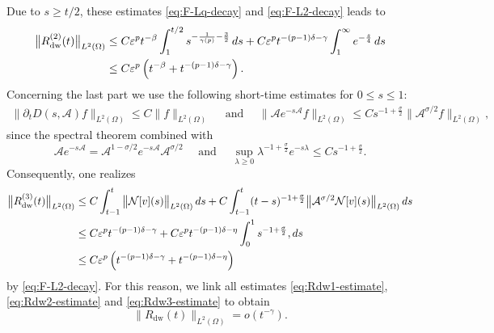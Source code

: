 \documentclass[a4paper,11pt]{article} %
\theoremstyle{remark}
\theoremstyle{definition}
\numberwithin{equation}{section}
\begin{document}
Due to \(s\ge t/2\), these estimates
\eqref{eq:F-Lq-decay} and \eqref{eq:F-L2-decay} leads to
\begin{align}
\big\|R_{\mathrm{dw}}^{(2)}(t)\big\|_{L^2(\Omega)}
&\le
C\varepsilon^p t^{-\beta}
\int_1^{t/2}s^{-\frac{1}{\gamma(p)}-\frac{3}{2}}\,ds
+
C\varepsilon^p t^{-(p-1)\delta-\gamma}
\int_1^\infty e^{-\frac{s}{4}}\,ds \notag\\
&\le
C\varepsilon^p
\left(
t^{-\beta}+t^{-(p-1)\delta-\gamma}
\right). \label{eq:Rdw2-estimate}
\end{align}
Concerning the last part we use the following short-time estimates for $0\le s\le1$:
\begin{align*}
    \big\|\partial_tD(s,\mathcal{A})f\big\|_{L^2(\Omega)} \le C\|f\|_{L^2(\Omega)} \quad \text{ and }\quad 
    \big\|\mathcal{A}e^{-s \mathcal{A}}f\big\|_{L^2(\Omega)} \le Cs^{-1+\frac{\sigma}{2}}\big\|\mathcal{A}^{\sigma/2}f\big\|_{L^2(\Omega)},
\end{align*}
since the spectral theorem combined with
$$
\mathcal{A}e^{-s \mathcal{A}}
=
\mathcal{A}^{1-\sigma/2}e^{-s \mathcal{A}}\mathcal{A}^{\sigma/2}
\quad \text{ and }\quad
\sup_{\lambda\ge0}
\lambda^{-1+\frac{\sigma}{2}}e^{-s\lambda}
\le
Cs^{-1+\frac{\sigma}{2}}.
$$
Consequently, one realizes
\begin{align}
\big\|R_{\mathrm{dw}}^{(3)}(t)\big\|_{L^2(\Omega)}
&\le
C\int_{t-1}^{t}\big\|\mathcal{N}[v](s)\big\|_{L^2(\Omega)}\,ds+
C\int_{t-1}^{t}
(t-s)^{-1+\frac{\sigma}{2}}
\big\|\mathcal{A}^{\sigma/2}\mathcal{N}[v](s)\big\|_{L^2(\Omega)}\,ds \notag\\
&\le
C\varepsilon^p t^{-(p-1)\delta-\gamma}
+
C\varepsilon^p t^{-(p-1)\delta-\eta}
\int_0^1s^{-1+\frac{\sigma}{2}},ds \notag\\
&\le
C\varepsilon^p
\left(
t^{-(p-1)\delta-\gamma}
+
t^{-(p-1)\delta-\eta}
\right)
\label{eq:Rdw3-estimate}
\end{align}
by \eqref{eq:F-L2-decay}. For this reason, we link all estimates \eqref{eq:Rdw1-estimate},
\eqref{eq:Rdw2-estimate} and
\eqref{eq:Rdw3-estimate} to obtain
\begin{equation}
\label{eq:Rdw-little-o}
\|R_{\mathrm{dw}}(t)\|_{L^2(\Omega)}
=
o(t^{-\gamma}).
\end{equation}
\end{document}
